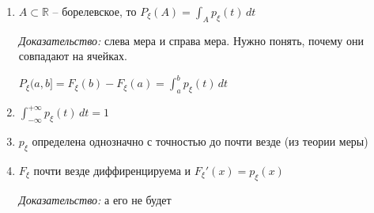 \begin{properties}
    \begin{enumerate}
        \item {
            $A \subset \mathbb{R}$ -- борелевское, то $P_{\xi} (A) = \int_{A} p_{\xi} (t) \, dt$

            \textit{Доказательство:} слева мера и справа мера. Нужно понять, почему
            они совпадают на ячейках. 

            $P_{\xi} (a, b] = F_{\xi} (b) - F_{\xi} (a) = \int_{a}^b p_{\xi} (t) \, dt$
        }
        \item {
            $\int_{-\infty}^{+\infty} p_{\xi} (t) \, dt = 1$
        }
        \item {
            $p_{\xi}$ определена однозначно с точностью до почти везде (из теории меры)
        }
        \item {
            $F_{\xi}$ почти везде диффиренцируема и $F_{\xi}' (x) = p_{\xi} (x)$

            \textit{Доказательство:} а его не будет
        }
    \end{enumerate}
\end{properties}

